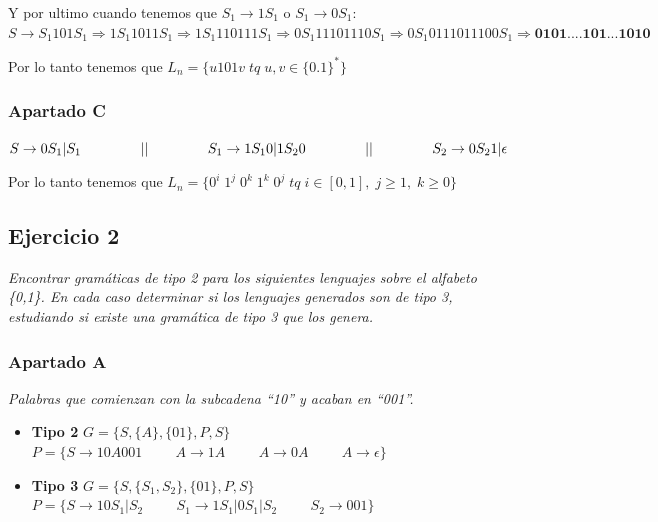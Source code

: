 Y por ultimo cuando tenemos que $ S_{1} \rightarrow 1S_{1} $ o $ S_{1} \rightarrow 0S_{1} $: \newline
$ S \rightarrow S_{1} 1 0 1 S_{1} \Rightarrow 1S_{1} 1 0 1 1S_{1} \Rightarrow 1S_{1} 1 1 0 1 1 1S_{1} \Rightarrow 0S_{1}11 1 0 111 0S_{1} \Rightarrow 0S_{1} 0 111 0 111 0 0S_{1} \Rightarrow \textbf{0101....101...1010} $ \newline

Por lo tanto tenemos que $ L_{n}=\{ u 101 v \; tq \; u,v \in \{0.1\}^{*} \} $

\newpage

\subsubsection{Apartado C} 

$ S \rightarrow 0S_{1} | S_{1} \hspace{1.5cm} || \hspace{1.5cm} S_{1} \rightarrow 1S_{1}0 | 1S_{2}0 \hspace{1.5cm} || \hspace{1.5cm} S_{2} \rightarrow 0S_{2}1 | \epsilon  $ \newline

Por lo tanto tenemos que $ L_{n}=\{ 0^{i} \; 1^{j} \; 0^{k} \; 1^{k} \; 0^{j}  \; tq \; i \in [0,1], \; j \ge 1, \; k \ge 0 \} $

\subsection{Ejercicio 2}

\textit{Encontrar gramáticas de tipo 2 para los siguientes lenguajes sobre el alfabeto \{0,1\}. En cada caso determinar si los lenguajes generados son de tipo 3, estudiando si existe una gramática de tipo 3 que los genera.}

\subsubsection{Apartado A} 

\textit{Palabras que comienzan con la subcadena “10” y acaban en “001”.}

\begin{itemize}
	\item \textbf{Tipo 2} \newline
	$ G = \{ S, \{ A \} , \{ 01 \}  ,P,S\} $ \newline
	$ P = \{ S \rightarrow 10A001 \hspace{1cm} A \rightarrow 1A \hspace{1cm} A \rightarrow 0A \hspace{1cm} A \rightarrow \epsilon \} $
	\item \textbf{Tipo 3} \newline
	$ G = \{ S, \{ S_{1},S_{2} \} , \{ 01 \}  ,P,S\} $ \newline
	$ P = \{ S \rightarrow 10S_{1} | S_{2} \hspace{1cm} S_{1} \rightarrow 1S_{1}|0S_{1}|S_{2} \hspace{1cm} S_{2} \rightarrow 001 \} $
\end{itemize}


